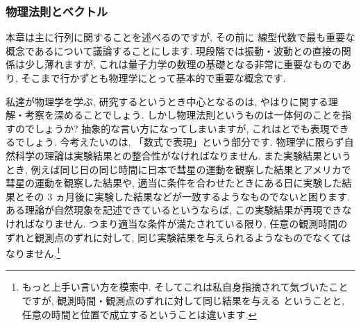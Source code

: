 \documentclass[openany, a4paper, oneside]{jsbook}
\theoremstyle{break}
\theoremstyle{breakdefn}
\begin{document}
\subsubsection{物理法則とベクトル}


本章は主に行列に関することを述べるのですが, その前に
線型代数で最も重要な概念であるについて議論することにします.
現段階では振動・波動との直接の関係は少し薄れますが,
これは量子力学の数理の基礎となる非常に重要なものであり,
そこまで行かずとも物理学にとって基本的で重要な概念です.

私達が物理学を学ぶ, 研究するというとき中心となるのは,
やはりに関する理解・考察を深めることでしょう.
しかし物理法則というものは一体何のことを指すのでしょうか?
抽象的な言い方になってしまいますが,
これはとでも表現できるでしょう.
今考えたいのは, 「数式で表現」という部分です.
物理学に限らず自然科学の理論は実験結果との整合性がなければなりません.
また実験結果というとき, 例えば同じ日の同じ時間に日本で彗星の運動を観察した結果とアメリカで彗星の運動を観察した結果や,
適当に条件を合わせたときにある日に実験した結果とその 3 ヵ月後に実験した結果などが一致するようなものでないと困ります.
ある理論が自然現象を記述できているというならば, この実験結果が再現できなければなりません.
つまり適当な条件が満たされている限り,
任意の観測時間のずれと観測点のずれに対して, 同じ実験結果を与えられるようなものでなくてはなりません.\footnote{もっと上手い言い方を模索中.
そしてこれは私自身指摘されて気づいたことですが, 観測時間・観測点のずれに対して同じ結果を与える
ということと, 任意の時間と位置で成立するということは違います.
 }
\end{document}
